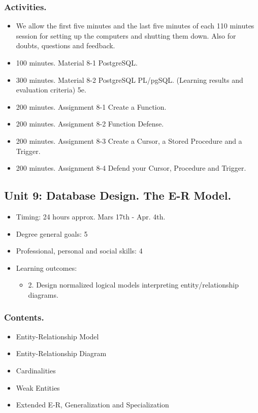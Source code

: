 \documentclass[catalan, a4paper, 12pt, titlepage]{article}
\begin{document}
  \subsubsection{Activities.}
  \begin{itemize}
          \item We allow the first five minutes and the last five minutes of each 110 minutes session for setting up the computers and shutting them down. Also for doubts, questions and feedback.
	  \item 100 minutes. Material 8-1 PostgreSQL.
	  \item 300 minutes. Material 8-2 PostgreSQL PL/pgSQL. (\faGraduationCap Learning results and evaluation criteria) 5e.
	  \item 200 minutes. Assignment 8-1 Create a Function.
	  \item 200 minutes. Assignment 8-2 Function Defense.
	  \item 200 minutes. Assignment 8-3 Create a Cursor, a Stored Procedure and a Trigger.
	  \item 200 minutes. Assignment 8-4 Defend your Cursor, Procedure and Trigger.
  \end{itemize}

  \subsection{Unit 9: Database Design. The E-R Model.}

  \begin{itemize}
	\item Timing: 24 hours approx. Mars 17th - Apr. 4th.
	\item Degree general goals: 5
	\item Professional, personal and social skills: 4
	\item Learning outcomes: 
		\begin{itemize}
			\item 2. Design normalized logical models interpreting entity/relationship diagrams.
		\end{itemize}
  \end{itemize}

  \subsubsection{Contents.}
  \begin{itemize}
	  \item Entity-Relationship Model
	  \item Entity-Relationship Diagram
	  \item Cardinalities
	  \item Weak Entities
	  \item Extended E-R, Generalization and Specialization
  \end{itemize}
\end{document}
